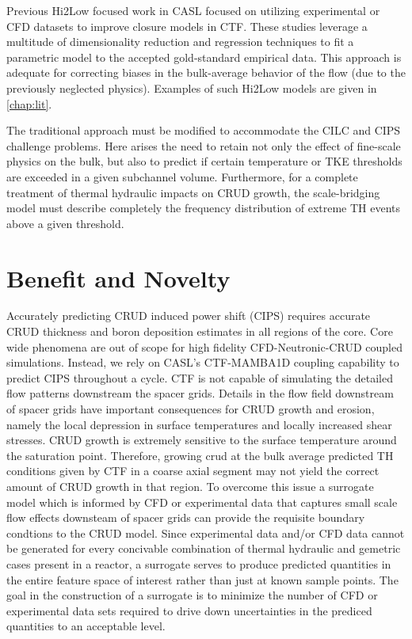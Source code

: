 Previous Hi2Low focused work in CASL focused on utilizing experimental or CFD
datasets to improve closure models in CTF.  These studies leverage a multitude of
dimensionality reduction and regression techniques
to fit a parametric model to the accepted gold-standard empirical data.  This approach
is adequate for correcting biases in the bulk-average behavior of the flow (due to
the previously neglected physics).  Examples of such Hi2Low models are given in
\autoref{chap:lit}.

The traditional approach must be modified to accommodate the CILC and
CIPS challenge problems.  Here arises the need to retain not only the effect of
fine-scale physics on the bulk, but also to predict if certain
temperature or TKE thresholds are exceeded in a given subchannel
volume.  Furthermore, for a complete treatment of thermal hydraulic impacts on
CRUD growth, the scale-bridging model must describe completely the frequency
distribution of extreme TH events above a given threshold.


\section{Benefit and Novelty}

Accurately predicting CRUD induced power shift (CIPS) requires accurate CRUD
thickness and boron deposition estimates in all regions of the core.  Core wide
phenomena are out of scope for high fidelity CFD-Neutronic-CRUD coupled
simulations.  Instead, we rely on CASL's CTF-MAMBA1D coupling capability to
predict CIPS throughout a cycle.  CTF is not capable of simulating the detailed
flow patterns downstream the spacer grids.  Details in the flow field
downstream of spacer grids have important consequences for CRUD growth and
erosion, namely the local depression in surface temperatures and locally
increased shear stresses.  CRUD growth is extremely sensitive to the surface
temperature around the saturation point.  Therefore, growing crud at the bulk
average predicted TH conditions given by CTF in a coarse axial segment may not
yield the correct amount of CRUD growth in that region.  To overcome this issue
a surrogate model which is informed by CFD or experimental data that
captures small scale flow effects downsteam of spacer grids can provide the 
requisite boundary condtions to the CRUD model.
Since experimental data and/or CFD data cannot be generated for every concivable
combination of thermal hydraulic and gemetric cases present in a reactor, a surrogate
serves to produce predicted quantities in the entire feature space of interest rather than just
at known sample points.  The goal in the construction of a surrogate is to minimize the
number of CFD or experimental data sets required to drive down uncertainties in
the prediced quantities to an acceptable level.

